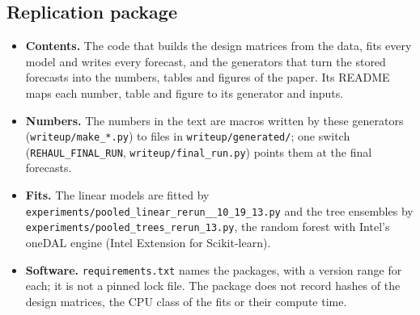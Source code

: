 \subsection{Replication package}
\label{app:rh_repro}
\begin{itemize}
\item \textbf{Contents.} The code that builds the design matrices from the data, fits every model and writes every
  forecast, and the generators that turn the stored forecasts into the numbers, tables and figures of the paper. Its
  README maps each number, table and figure to its generator and inputs.
\item \textbf{Numbers.} The numbers in the text are macros written by these generators
  (\texttt{writeup/\allowbreak make\_*.py}) to files in \texttt{writeup/\allowbreak generated/}; one switch
  (\texttt{REHAUL\_\allowbreak FINAL\_\allowbreak RUN}, \texttt{writeup/\allowbreak final\_run.py}) points them at the
  final forecasts.
\item \textbf{Fits.} The linear models are fitted by
  \texttt{experiments/\allowbreak pooled\_\allowbreak linear\_\allowbreak rerun\_\_10\_19\_13.py} and
  the tree ensembles by \texttt{experiments/\allowbreak pooled\_\allowbreak trees\_\allowbreak rerun\_13.py}, the
  random forest with Intel's oneDAL engine
  (Intel Extension for Scikit-learn).
\item \textbf{Software.} \texttt{requirements.txt} names the packages, with a version range for each; it is not a
  pinned lock file. The package does not record hashes of the design matrices, the CPU class of the fits or their
  compute time.
\end{itemize}

